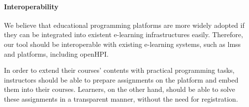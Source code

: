 \paragraph{Interoperability}

We believe that educational programming platforms are more widely adopted if they can be integrated into existent e-learning infrastructures easily. Therefore, our tool should be interoperable with existing e-learning systems, such as \glspl{lms} and \mooc platforms, including openHPI.

In order to extend their courses' contents with practical programming tasks, instructors should be able to prepare assignments on the \tool platform and embed them into their courses. Learners, on the other hand, should be able to solve these assignments in a transparent manner, without the need for registration.
